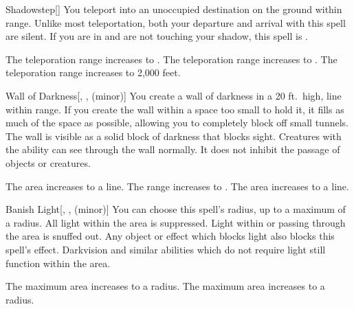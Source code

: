 \lowercase{\hypertarget{spell:Shadowstep}{}}\label{spell:Shadowstep}
\begin{freeability}[Rank 1]{\hypertarget{spell:Shadowstep}{Shadowstep}}[]
You teleport into an unoccupied destination on the ground within \rngmed range.
Unlike most teleportation, both your departure and arrival with this spell are silent.
If you are in  and are not touching your shadow, this spell is .

\rankline
{} The teleporation range increases to \rnglong.
 The teleporation range increases to \rngext.
 The teleporation range increases to 2,000 feet.
\end{freeability}
\vspace{0.25em}



\lowercase{\hypertarget{spell:Wall of Darkness}{}}\label{spell:Wall of Darkness}
\begin{freeability}[Rank 1]{\hypertarget{spell:Wall of Darkness}{Wall of Darkness}}[, ,  (minor)]
\targetrule
You create a wall of darkness in a 20 ft.\ high, \areamed line within \rngmed range.
If you create the wall within a space too small to hold it, it fills as much of the space as possible, allowing you to completely block off small tunnels.
The wall is visible as a solid block of darkness that blocks sight.
Creatures with the  ability can see through the wall normally.
It does not inhibit the passage of objects or creatures.

\rankline
{} The area increases to a \arealarge line.
 The range increases to \rnglong.
 The area increases to a \areahuge line.
\end{freeability}
\vspace{0.25em}



\lowercase{\hypertarget{spell:Banish Light}{}}\label{spell:Banish Light}
\begin{freeability}[Rank 3]{\hypertarget{spell:Banish Light}{Banish Light}}[, ,  (minor)]
You can choose this spell's radius, up to a maximum of a \areamed radius.
All light within the area is suppressed.
Light within or passing through the area is snuffed out.
Any object or effect which blocks light also blocks this spell's effect.
Darkvision and similar abilities which do not require light still function within the area.

\rankline
{} The maximum area increases to a \arealarge radius.
 The maximum area increases to a \areaext radius.
\end{freeability}
\vspace{0.25em}



